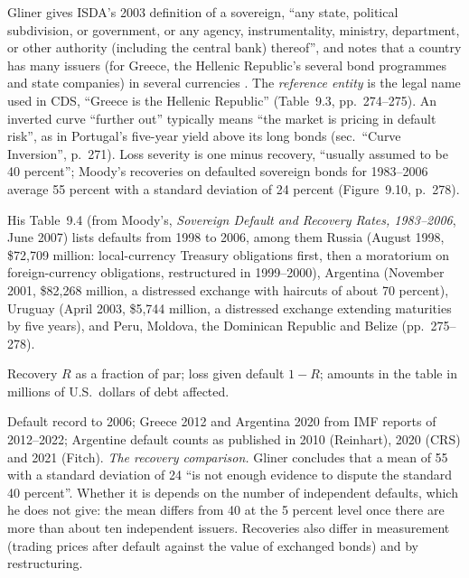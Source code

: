 \begin{qfdefinition}\label{def:sovereign-credit-defaults}
 Gliner gives ISDA's 2003 definition of a sovereign, ``any state, political subdivision, or government, or any agency, instrumentality, ministry, department, or other authority (including the central bank) thereof'', and notes that a country has many issuers (for Greece, the Hellenic Republic's several bond programmes and state companies) in several currencies \citep[chap.~9, sec.\ ``Sovereign Credit'', PDF pp.~269--270]{s7-gliner}. The \emph{reference entity} is the legal name used in CDS, ``Greece is the Hellenic Republic'' (Table~9.3, pp.~274--275). An inverted curve ``further out'' typically means ``the market is pricing in default risk'', as in Portugal's five-year yield above its long bonds (sec.\ ``Curve Inversion'', p.~271). Loss severity is one minus recovery, ``usually assumed to be 40 percent''; Moody's recoveries on defaulted sovereign bonds for 1983--2006 average 55 percent with a standard deviation of 24 percent (Figure~9.10, p.~278).

His Table~9.4 (from Moody's, \emph{Sovereign Default and Recovery Rates, 1983--2006}, June 2007) lists defaults from 1998 to 2006, among them Russia (August 1998, \$72,709 million: local-currency Treasury obligations first, then a moratorium on foreign-currency obligations, restructured in 1999--2000), Argentina (November 2001, \$82,268 million, a distressed exchange with haircuts of about 70 percent), Uruguay (April 2003, \$5,744 million, a distressed exchange extending maturities by five years), and Peru, Moldova, the Dominican Republic and Belize (pp.~275--278).

 Recovery $R$ as a fraction of par; loss given default $1-R$; amounts in the table in millions of U.S.\ dollars of debt affected.

 Default record to 2006; Greece 2012 and Argentina 2020 from IMF reports of 2012--2022; Argentine default counts as published in 2010 (Reinhart), 2020 (CRS) and 2021 (Fitch). \emph{The recovery comparison.} Gliner concludes that a mean of 55 with a standard deviation of 24 ``is not enough evidence to dispute the standard 40 percent''. Whether it is depends on the number of independent defaults, which he does not give: the mean differs from 40 at the 5 percent level once there are more than about ten independent issuers. Recoveries also differ in measurement (trading prices after default against the value of exchanged bonds) and by restructuring.


\end{qfdefinition}
